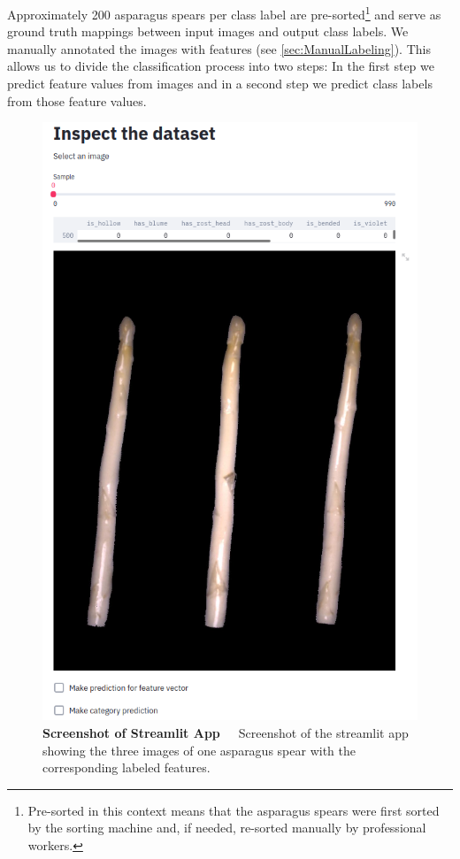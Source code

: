 Approximately 200 asparagus spears per class label are pre-sorted\footnote{Pre-sorted in this context means that the asparagus spears were first sorted by the sorting machine and, if needed, re-sorted manually by professional workers.} and serve as ground truth mappings between input images and output class labels. We manually annotated the images with features (see \autoref{sec:ManualLabeling}). This allows us to divide the classification process into two steps: In the first step we predict feature values from images and in a second step we predict class labels from those feature values.

\begin{figure}[!htb]
	\centering
	\includegraphics[scale=0.4]{Figures/chapter04/ftl_streamlit_app.png}
	\decoRule
	\caption[Screenshot of the Streamlit App]{\textbf{Screenshot of Streamlit App}~~~Screenshot of the streamlit app showing the three images of one asparagus spear with the corresponding labeled features.}
    \label{fig:FeaturetoLabelStreamlitApp}
\end{figure}    

